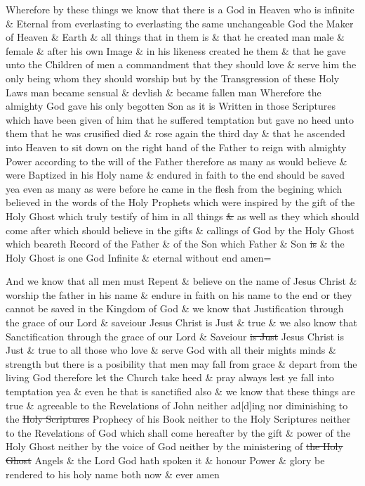 		Wherefore by these things we know that there is a God in Heaven who is infinite \& Eternal from everlasting to everlasting the same unchangeable God the Maker of Heaven \& Earth \& all things that in them is \& that he created man male \& female \& after his own Image \& in his likeness created he them \& that he gave unto the Children of men a commandment that they should love \& serve him the only being whom they should worship but by the Transgression of these Holy Laws man became sensual \& devlish \& became fallen man Wherefore the almighty God gave his only begotten Son as it is Written in those Scriptures which have been given of him that he suffered temptation but gave no heed unto them that he was crusified died \& rose again the third day \& that he ascended into Heaven to sit down on the right hand of the Father to reign with almighty Power according to the will of the Father therefore as many as would believe \& were Baptized in his Holy name \& endured in faith to the end should be saved yea even as many as were before he came in the flesh from the begining which believed in the words of the Holy Prophets which were inspired by the gift of the Holy Ghost which truly testify of him in all things \sout{\&} as well as they which should come after which should believe in the gifts \& callings of God by the Holy Ghost which beareth Record of the Father \& of the Son which Father \& Son \sout{is} \& the Holy Ghost is one God Infinite \& eternal without end amen=

		And we know that all men must Repent \& believe on the name of Jesus Christ \& worship the father in his name \& endure in faith on his name to the end or they cannot be saved in the Kingdom of God \& we know that Justification through the grace of our Lord \& saveiour Jesus Christ is Just \& true \& we also know that Sanctification through the grace of our Lord \& Saveiour \sout{is Just} Jesus Christ is Just \& true to all those who love \& serve God with all their mights minds \& strength but there is a posibility that men may fall from grace \& depart from the living God therefore let the Church take heed \& pray always lest ye fall into temptation yea \& even he that is sanctified also \& we know that these things are true \& agreeable to the Revelations of John neither ad[d]ing nor diminishing to the \sout{Holy Scriptures} Prophecy of his Book neither to the Holy Scriptures neither to the Revelations of God which shall come hereafter by the gift \& power of the Holy Ghost neither by the voice of God neither by the ministering of \sout{the Holy Ghost} Angels \& the Lord God hath spoken it \& honour Power \& glory be rendered to his holy name both now \& ever amen

